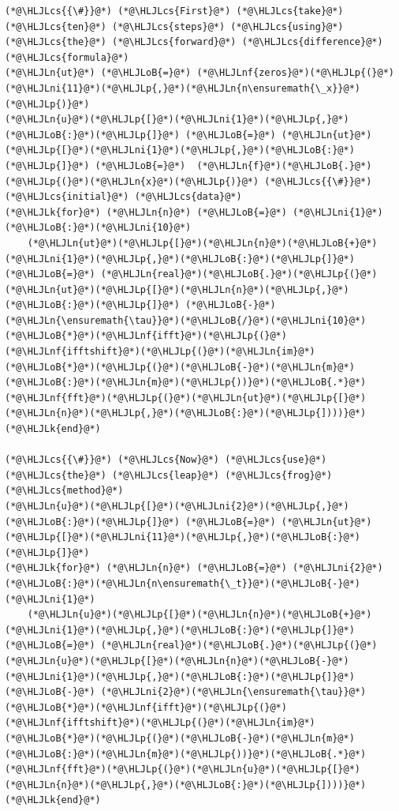 \documentclass[12pt,landscape]{article}
\newcommand{\HLJLk}[1]{\textcolor[RGB]{148,91,176}{\textbf{#1}}}
\newcommand{\HLJLn}[1]{#1}
\newcommand{\HLJLnf}[1]{\textcolor[RGB]{66,102,213}{#1}}
\newcommand{\HLJLni}[1]{\textcolor[RGB]{59,151,46}{#1}}
\newcommand{\HLJLoB}[1]{\textcolor[RGB]{102,102,102}{\textbf{#1}}}
\newcommand{\HLJLp}[1]{#1}
\newcommand{\HLJLcs}[1]{\textcolor[RGB]{153,153,119}{\textit{#1}}}
\begin{document}
{\begin{lstlisting}
(*@\HLJLcs{{\#}}@*) (*@\HLJLcs{First}@*) (*@\HLJLcs{take}@*) (*@\HLJLcs{ten}@*) (*@\HLJLcs{steps}@*) (*@\HLJLcs{using}@*) (*@\HLJLcs{the}@*) (*@\HLJLcs{forward}@*) (*@\HLJLcs{difference}@*) (*@\HLJLcs{formula}@*)
(*@\HLJLn{ut}@*) (*@\HLJLoB{=}@*) (*@\HLJLnf{zeros}@*)(*@\HLJLp{(}@*)(*@\HLJLni{11}@*)(*@\HLJLp{,}@*)(*@\HLJLn{n\ensuremath{\_x}}@*)(*@\HLJLp{)}@*)
(*@\HLJLn{u}@*)(*@\HLJLp{[}@*)(*@\HLJLni{1}@*)(*@\HLJLp{,}@*)(*@\HLJLoB{:}@*)(*@\HLJLp{]}@*) (*@\HLJLoB{=}@*) (*@\HLJLn{ut}@*)(*@\HLJLp{[}@*)(*@\HLJLni{1}@*)(*@\HLJLp{,}@*)(*@\HLJLoB{:}@*)(*@\HLJLp{]}@*) (*@\HLJLoB{=}@*)  (*@\HLJLn{f}@*)(*@\HLJLoB{.}@*)(*@\HLJLp{(}@*)(*@\HLJLn{x}@*)(*@\HLJLp{)}@*) (*@\HLJLcs{{\#}}@*) (*@\HLJLcs{initial}@*) (*@\HLJLcs{data}@*)
(*@\HLJLk{for}@*) (*@\HLJLn{n}@*) (*@\HLJLoB{=}@*) (*@\HLJLni{1}@*)(*@\HLJLoB{:}@*)(*@\HLJLni{10}@*)
    (*@\HLJLn{ut}@*)(*@\HLJLp{[}@*)(*@\HLJLn{n}@*)(*@\HLJLoB{+}@*)(*@\HLJLni{1}@*)(*@\HLJLp{,}@*)(*@\HLJLoB{:}@*)(*@\HLJLp{]}@*) (*@\HLJLoB{=}@*) (*@\HLJLn{real}@*)(*@\HLJLoB{.}@*)(*@\HLJLp{(}@*)(*@\HLJLn{ut}@*)(*@\HLJLp{[}@*)(*@\HLJLn{n}@*)(*@\HLJLp{,}@*)(*@\HLJLoB{:}@*)(*@\HLJLp{]}@*) (*@\HLJLoB{-}@*) (*@\HLJLn{\ensuremath{\tau}}@*)(*@\HLJLoB{/}@*)(*@\HLJLni{10}@*)(*@\HLJLoB{*}@*)(*@\HLJLnf{ifft}@*)(*@\HLJLp{(}@*)(*@\HLJLnf{ifftshift}@*)(*@\HLJLp{(}@*)(*@\HLJLn{im}@*)(*@\HLJLoB{*}@*)(*@\HLJLp{(}@*)(*@\HLJLoB{-}@*)(*@\HLJLn{m}@*)(*@\HLJLoB{:}@*)(*@\HLJLn{m}@*)(*@\HLJLp{))}@*)(*@\HLJLoB{.*}@*)(*@\HLJLnf{fft}@*)(*@\HLJLp{(}@*)(*@\HLJLn{ut}@*)(*@\HLJLp{[}@*)(*@\HLJLn{n}@*)(*@\HLJLp{,}@*)(*@\HLJLoB{:}@*)(*@\HLJLp{])))}@*)
(*@\HLJLk{end}@*)

(*@\HLJLcs{{\#}}@*) (*@\HLJLcs{Now}@*) (*@\HLJLcs{use}@*) (*@\HLJLcs{the}@*) (*@\HLJLcs{leap}@*) (*@\HLJLcs{frog}@*) (*@\HLJLcs{method}@*)
(*@\HLJLn{u}@*)(*@\HLJLp{[}@*)(*@\HLJLni{2}@*)(*@\HLJLp{,}@*)(*@\HLJLoB{:}@*)(*@\HLJLp{]}@*) (*@\HLJLoB{=}@*) (*@\HLJLn{ut}@*)(*@\HLJLp{[}@*)(*@\HLJLni{11}@*)(*@\HLJLp{,}@*)(*@\HLJLoB{:}@*)(*@\HLJLp{]}@*)
(*@\HLJLk{for}@*) (*@\HLJLn{n}@*) (*@\HLJLoB{=}@*) (*@\HLJLni{2}@*)(*@\HLJLoB{:}@*)(*@\HLJLn{n\ensuremath{\_t}}@*)(*@\HLJLoB{-}@*)(*@\HLJLni{1}@*)
    (*@\HLJLn{u}@*)(*@\HLJLp{[}@*)(*@\HLJLn{n}@*)(*@\HLJLoB{+}@*)(*@\HLJLni{1}@*)(*@\HLJLp{,}@*)(*@\HLJLoB{:}@*)(*@\HLJLp{]}@*) (*@\HLJLoB{=}@*) (*@\HLJLn{real}@*)(*@\HLJLoB{.}@*)(*@\HLJLp{(}@*)(*@\HLJLn{u}@*)(*@\HLJLp{[}@*)(*@\HLJLn{n}@*)(*@\HLJLoB{-}@*)(*@\HLJLni{1}@*)(*@\HLJLp{,}@*)(*@\HLJLoB{:}@*)(*@\HLJLp{]}@*) (*@\HLJLoB{-}@*) (*@\HLJLni{2}@*)(*@\HLJLn{\ensuremath{\tau}}@*)(*@\HLJLoB{*}@*)(*@\HLJLnf{ifft}@*)(*@\HLJLp{(}@*)(*@\HLJLnf{ifftshift}@*)(*@\HLJLp{(}@*)(*@\HLJLn{im}@*)(*@\HLJLoB{*}@*)(*@\HLJLp{(}@*)(*@\HLJLoB{-}@*)(*@\HLJLn{m}@*)(*@\HLJLoB{:}@*)(*@\HLJLn{m}@*)(*@\HLJLp{))}@*)(*@\HLJLoB{.*}@*)(*@\HLJLnf{fft}@*)(*@\HLJLp{(}@*)(*@\HLJLn{u}@*)(*@\HLJLp{[}@*)(*@\HLJLn{n}@*)(*@\HLJLp{,}@*)(*@\HLJLoB{:}@*)(*@\HLJLp{])))}@*)
(*@\HLJLk{end}@*)
\end{lstlisting}


}
\end{document}
